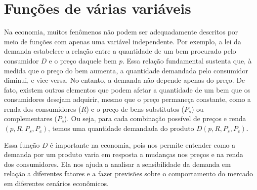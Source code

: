 

\chapter{Funções de várias variáveis}






Na economia, muitos fenômenos não podem ser adequadamente descritos por meio de funções com apenas uma variável independente. Por exemplo, a lei da demanda estabelece a relação entre a quantidade de um bem procurado pelo consumidor \(D\) e o preço daquele bem \(p\). Essa relação fundamental sustenta que, à medida que o preço do bem aumenta, a quantidade demandada pelo consumidor diminui, e vice-versa. No entanto, a demanda não depende apenas do preço. De fato, existem outros elementos que podem afetar a quantidade de um bem que os consumidores desejam adquirir, mesmo que o preço permaneça constante, como a renda dos consumidores (\(R\)) e o preço de bens substitutos (\(P_s\)) ou complementares (\(P_c\)). Ou seja, para cada combinação possível de preços e renda \((p, R, P_s, P_c)\), temos uma quantidade demandada do produto \(D(p, R, P_s, P_c)\). 

Essa função \(D\) é importante na economia, pois nos permite entender como a demanda por um produto varia em resposta a mudanças nos preços e na renda dos consumidores. Ela nos ajuda a analisar a sensibilidade da demanda em relação a diferentes fatores e a fazer previsões sobre o comportamento do mercado em diferentes cenários econômicos. 

